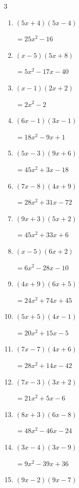 \begin{multicols}{3}
\begin{enumerate}
        $=9x^{2}+12x-5$

\columnbreak %

\resetques

  \item $(5x+4)(5x-4)$

        $=25x^{2}-16$

  \item $(x-5)(5x+8)$

        $=5x^{2}-17x-40$

  \item $(x-1)(2x+2)$

        $=2x^{2}-2$

  \item $(6x-1)(3x-1)$

        $=18x^{2}-9x+1$

  \item $(5x-3)(9x+6)$

        $=45x^{2}+3x-18$

  \item $(7x-8)(4x+9)$

        $=28x^{2}+31x-72$

  \item $(9x+3)(5x+2)$

        $=45x^{2}+33x+6$

  \item $(x-5)(6x+2)$

        $=6x^{2}-28x-10$

  \item $(4x+9)(6x+5)$

        $=24x^{2}+74x+45$

  \item $(5x+5)(4x-1)$

        $=20x^{2}+15x-5$

  \item $(7x-7)(4x+6)$

        $=28x^{2}+14x-42$

  \item $(7x-3)(3x+2)$

        $=21x^{2}+5x-6$

  \item $(8x+3)(6x-8)$

        $=48x^{2}-46x-24$

  \item $(3x-4)(3x-9)$

        $=9x^{2}-39x+36$

  \item $(9x-2)(9x-7)$


\end{enumerate}
\end{multicols}
